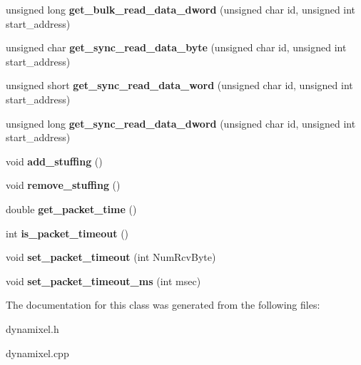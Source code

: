\begin{DoxyCompactItemize}
\item 
\hypertarget{classdynamixel2_a2a896c35eab94d52c5b5e795daa978a3}{}unsigned long {\bfseries get\+\_\+bulk\+\_\+read\+\_\+data\+\_\+dword} (unsigned char id, unsigned int start\+\_\+address)\label{classdynamixel2_a2a896c35eab94d52c5b5e795daa978a3}

\item 
\hypertarget{classdynamixel2_a30691b3d428a8937cc53142e3c22e94f}{}unsigned char {\bfseries get\+\_\+sync\+\_\+read\+\_\+data\+\_\+byte} (unsigned char id, unsigned int start\+\_\+address)\label{classdynamixel2_a30691b3d428a8937cc53142e3c22e94f}

\item 
\hypertarget{classdynamixel2_a5afed0047167b1a4262d7fb961faa488}{}unsigned short {\bfseries get\+\_\+sync\+\_\+read\+\_\+data\+\_\+word} (unsigned char id, unsigned int start\+\_\+address)\label{classdynamixel2_a5afed0047167b1a4262d7fb961faa488}

\item 
\hypertarget{classdynamixel2_a4f25408bacde5a8a3b00b2f7f79f0202}{}unsigned long {\bfseries get\+\_\+sync\+\_\+read\+\_\+data\+\_\+dword} (unsigned char id, unsigned int start\+\_\+address)\label{classdynamixel2_a4f25408bacde5a8a3b00b2f7f79f0202}

\item 
\hypertarget{classdynamixel2_a350920b911d0ad2116b91f2149b840c7}{}void {\bfseries add\+\_\+stuffing} ()\label{classdynamixel2_a350920b911d0ad2116b91f2149b840c7}

\item 
\hypertarget{classdynamixel2_a910c7b80ace3a816641468b32c0290a6}{}void {\bfseries remove\+\_\+stuffing} ()\label{classdynamixel2_a910c7b80ace3a816641468b32c0290a6}

\item 
\hypertarget{classdynamixel2_a7d4d98424dc85511970e9a405b919594}{}double {\bfseries get\+\_\+packet\+\_\+time} ()\label{classdynamixel2_a7d4d98424dc85511970e9a405b919594}

\item 
\hypertarget{classdynamixel2_a4c996c0d9edcfd320906674512837a9e}{}int {\bfseries is\+\_\+packet\+\_\+timeout} ()\label{classdynamixel2_a4c996c0d9edcfd320906674512837a9e}

\item 
\hypertarget{classdynamixel2_a132d723a321ba225f75f2c79e5d4d27b}{}void {\bfseries set\+\_\+packet\+\_\+timeout} (int Num\+Rcv\+Byte)\label{classdynamixel2_a132d723a321ba225f75f2c79e5d4d27b}

\item 
\hypertarget{classdynamixel2_a7d85d44aa6c1fe51f952f395a79296d5}{}void {\bfseries set\+\_\+packet\+\_\+timeout\+\_\+ms} (int msec)\label{classdynamixel2_a7d85d44aa6c1fe51f952f395a79296d5}

\end{DoxyCompactItemize}


The documentation for this class was generated from the following files\+:\begin{DoxyCompactItemize}
\item 
dynamixel.\+h\item 
dynamixel.\+cpp\end{DoxyCompactItemize}
